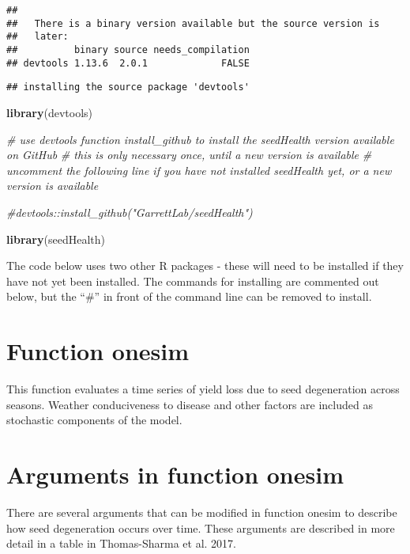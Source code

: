 \documentclass[]{article}
\newenvironment{Shaded}{\begin{snugshade}}{\end{snugshade}}
\newcommand{\KeywordTok}[1]{\textcolor[rgb]{0.13,0.29,0.53}{\textbf{#1}}}
\newcommand{\CommentTok}[1]{\textcolor[rgb]{0.56,0.35,0.01}{\textit{#1}}}
\newcommand{\NormalTok}[1]{#1}
\begin{document}
\begin{verbatim}
## 
##   There is a binary version available but the source version is
##   later:
##          binary source needs_compilation
## devtools 1.13.6  2.0.1             FALSE
\end{verbatim}

\begin{verbatim}
## installing the source package 'devtools'
\end{verbatim}

\begin{Shaded}
\begin{Highlighting}[]
\KeywordTok{library}\NormalTok{(devtools)}

\CommentTok{# use devtools function install_github to install the seedHealth version available on GitHub}
\CommentTok{# this is only necessary once, until a new version is available}
\CommentTok{# uncomment the following line if you have not installed seedHealth yet, or a new version is available}

\CommentTok{#devtools::install_github("GarrettLab/seedHealth")}

\KeywordTok{library}\NormalTok{(seedHealth)}
\end{Highlighting}
\end{Shaded}

The code below uses two other R packages - these will need to be
installed if they have not yet been installed. The commands for
installing are commented out below, but the ``\#'' in front of the
command line can be removed to install.

\section{Function onesim}\label{function-onesim}

This function evaluates a time series of yield loss due to seed
degeneration across seasons. Weather conduciveness to disease and other
factors are included as stochastic components of the model.

\section{Arguments in function
onesim}\label{arguments-in-function-onesim}

There are several arguments that can be modified in function onesim to
describe how seed degeneration occurs over time. These arguments are
described in more detail in a table in Thomas-Sharma et al. 2017.
\end{document}
